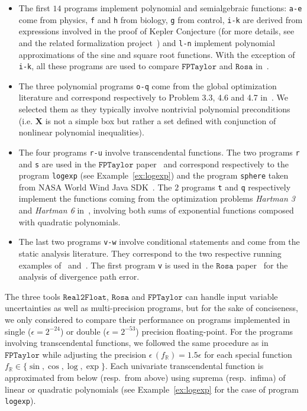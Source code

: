 \documentclass[preprint,fleqn,nocopyrightspace]{sigplanconf}
\newcommand{\code}[1]{\lstinline{#1}}
\newcommand{\R}{\mathbb{R}}
\def\X{\mathbf{X}}
\newcommand{\realtofloat}{\mathtt{Real2Float}}
\newcommand{\rosa}{\mathtt{Rosa}}
\newcommand{\fptaylor}{\mathtt{FPTaylor}}
\theoremstyle{plain}
\begin{document}
\begin{itemize}[noitemsep,nolistsep]
\item The first $14$ programs implement polynomial and semialgebraic functions: \code{a-e} come from physics, \code{f} and \code{h} from biology, \code{g} from control, \code{i-k} are derived from expressions involved in the proof of Kepler Conjecture (for more details, see~\cite{halesalgo} and the related formalization project~\cite{Flyspeck06}) and \code{l-n} implement polynomial approximations of the sine and square root functions. With the exception of \code{i-k}, all these programs are used to compare $\fptaylor$ and $\rosa$ in~\cite{fptaylor15}. 
\item The three polynomial programs \code{o-q} come from the global optimization literature and correspond respectively to Problem 3.3, 4.6 and 4.7 in~\cite{Floudas90}. We selected them as they typically involve nontrivial polynomial preconditions (i.e. $\X$ is not a simple box but rather a set defined with conjunction of nonlinear polynomial inequalities).
\item The four programs \code{r-u} involve transcendental functions. The two programs \code{r} and \code{s} are used in the $\fptaylor$ paper~\cite{fptaylor15} and correspond respectively to the program \code{logexp} (see Example~\ref{ex:logexp}) and the program \code{sphere} taken from NASA World Wind Java SDK~\cite{NASA}. The $2$ programs \code{t} and \code{q} respectively implement the functions coming from the optimization problems \textit{Hartman 3} and \textit{Hartman 6} in~\cite{Ali05}, involving both sums of exponential functions composed with quadratic polynomials.
\item The last two programs \code{v-w} involve conditional statements and come from the static analysis literature. They correspond to the two respective running examples of~\cite{Zonotope10} and~\cite{Marechal14}. The first program \code{v} is used in the $\rosa$ paper~\cite{Darulova14Popl} for the analysis of divergence path error.
\end{itemize}
%
The three tools $\realtofloat$, $\rosa$ and $\fptaylor$ can handle input variable uncertainties as well as multi-precision programs, but for the sake of conciseness, we only considered to compare their performance on programs implemented in single ($\epsilon = 2^{-24}$) or double ($\epsilon = 2^{-53}$) precision floating-point.
For the programs involving transcendental functions, we followed the same procedure as in $\fptaylor$ while adjusting the precision $\epsilon \,  (f_{\R}) = 1.5 \epsilon$ for each special function $f_{\R} \in \{\sin, \cos, \log, \exp \}$. Each univariate transcendental function is approximated from below (resp.~from above) using suprema (resp.~infima) of linear or quadratic polynomials (see Example~\ref{ex:logexp} for the case of program \code{logexp}). 
%
\end{document}
